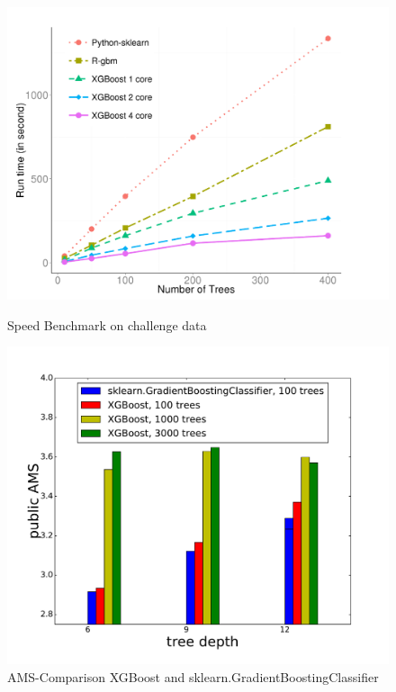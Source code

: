 \begin{figure}[h]
\centering
\begin{minipage}[b]{0.48\textwidth}
  \centering
  \includegraphics[trim=0 14 60 0,clip,width=\linewidth]{images/xgboost-speed}
  \vspace{-0.1ex}
	\caption{Speed Benchmark on challenge data \cite{chen14}}
	\label{fig:xgb-speed}
\end{minipage}
\quad
\begin{minipage}[b]{0.48\textwidth}
  \centering
  \includegraphics[trim=30 0 40 0,clip,width=\linewidth]{images/xgb-gbc.pdf}
	\caption{AMS-Comparison XGBoost and sklearn.GradientBoostingClassifier}
	\label{fig:xgb-gbc}
\end{minipage}
\end{figure}

